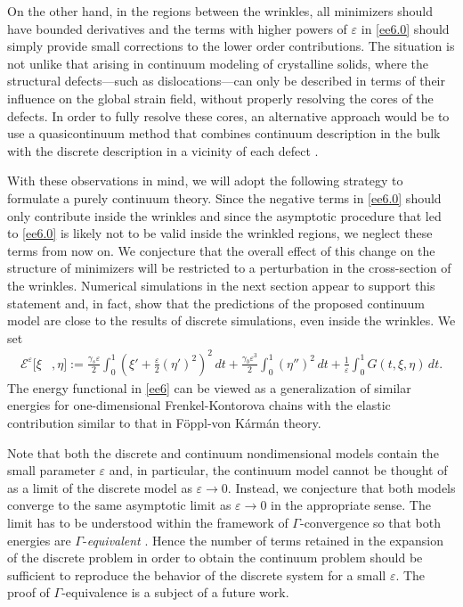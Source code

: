 \documentclass{siamltex}
\newcommand{\eps}{\varepsilon}
\begin{document}
On the other hand, in the regions between the wrinkles, all minimizers should have bounded derivatives and the terms with higher powers of $\eps$ in \eqref{ee6.0} should simply provide small corrections to the lower order contributions. The situation is not unlike that arising in continuum modeling of crystalline solids, where the structural defects---such as dislocations---can only be described in terms of their influence on the global strain field, without properly resolving the cores of the defects. {In order to fully resolve these cores, an alternative approach would be to use a quasicontinuum method that combines continuum description in the bulk with the discrete description in a vicinity of each defect \cite{blanc_lebris_lions_2007}.}

{With these observations in mind, we will adopt the following strategy to formulate a purely continuum theory.} Since the negative terms in \eqref{ee6.0} should only contribute inside the wrinkles and since the asymptotic procedure that led to \eqref{ee6.0} is likely not to be valid inside the wrinkled regions, we neglect these terms from now on. We conjecture that the overall effect of this change on the structure of minimizers will be restricted to a perturbation in the cross-section of the wrinkles. {Numerical simulations in the next section appear to support this statement and, in fact, show that the predictions of the proposed continuum model are close to the results of discrete simulations, even inside the wrinkles.} We set
%
\begin{align}
	\mathcal E^\eps[\xi&,\eta] := 
        \frac{\gamma_{s}\varepsilon}{2}\int_{0}^{1}\!\left(\xi'+\frac{\varepsilon}{2}(\eta')^{2}\right)^{2}
        \,dt
        +
        \frac{\gamma_{b}\varepsilon^3}{2}\int_{0}^{1}\!\left(\eta''\right)^{2}\,dt
        +
        \frac{1}{\varepsilon}\!\int_{0}^{1}\!G(t,\xi,\eta)\,dt.
        \label{ee6}
\end{align}
The energy functional in \eqref{ee6} can be viewed as a
generalization of similar energies for one-dimensional
Frenkel-Kontorova chains with the elastic contribution similar to that in F\"oppl-von
K\'arm\'an theory.

{Note that both the discrete and continuum nondimensional models contain the small parameter $\varepsilon$ and, in particular, the continuum model cannot be thought of as a limit of the discrete model as $\varepsilon\to0$. Instead, we conjecture that both models converge to the same asymptotic limit as $\varepsilon\to0$ in the appropriate sense. The limit has to be understood within the framework of $\Gamma$-convergence \cite{braides2002gamma} so that both energies are $\Gamma$-{\it equivalent} \cite{braides2008asymptotic}. Hence the number of terms retained in the expansion of the discrete problem in order to obtain the continuum problem should be sufficient to reproduce the behavior of the discrete system for a small $\varepsilon$. The proof of $\Gamma$-equivalence is a subject of a future work.}
\end{document}
